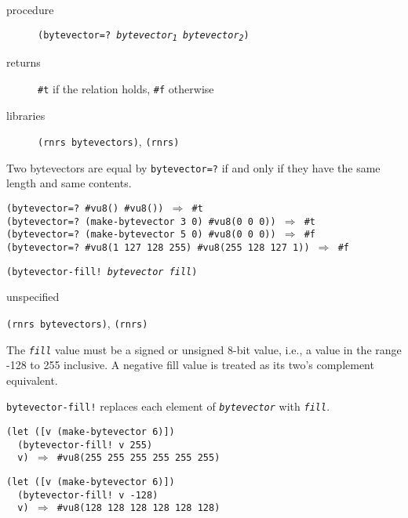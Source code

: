 \begin{description}

\label{objects_s244}\item[procedure] \texttt{(bytevector=? \textit{bytevector\textsubscript{1}} \textit{bytevector\textsubscript{2}})}



\item[returns] \texttt{\#{}t} if the relation holds, \texttt{\#{}f} otherwise


\item[libraries] \texttt{(rnrs bytevectors)}, \texttt{(rnrs)}
\end{description}


Two bytevectors are equal by \texttt{bytevector=?} if and only if they
have the same length and same contents.


\begin{alltt}
(bytevector=? \#{}vu8() \#{}vu8()) \(\Rightarrow\) \#{}t
(bytevector=? (make-bytevector 3 0) \#{}vu8(0 0 0)) \(\Rightarrow\) \#{}t
(bytevector=? (make-bytevector 5 0) \#{}vu8(0 0 0)) \(\Rightarrow\) \#{}f
(bytevector=? \#{}vu8(1 127 128 255) \#{}vu8(255 128 127 1)) \(\Rightarrow\) \#{}f
\end{alltt}

\begin{description}

\label{objects_s245}\item[procedure] \texttt{(bytevector-fill! \textit{bytevector} \textit{fill})}



\item[returns] unspecified


\item[libraries] \texttt{(rnrs bytevectors)}, \texttt{(rnrs)}
\end{description}


The \texttt{\textit{fill}} value must be a signed or unsigned 8-bit value, i.e.,
a value in the range -128 to 255 inclusive.
A negative fill value is treated as its two's complement equivalent.

\texttt{bytevector-fill!} replaces each element of \texttt{\textit{bytevector}} with
\texttt{\textit{fill}}.

\begin{alltt}
(let ([v (make-bytevector 6)])
  (bytevector-fill! v 255)
  v) \(\Rightarrow\) \#{}vu8(255 255 255 255 255 255)

(let ([v (make-bytevector 6)])
  (bytevector-fill! v -128)
  v) \(\Rightarrow\) \#{}vu8(128 128 128 128 128 128)
\end{alltt}

